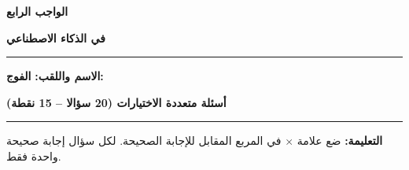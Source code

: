 \documentclass[a4paper]{article}
\newif\ifcorrection
\begin{document}
\begin{center}

{\Large\khatt\textbf{الواجب الرابع}\ifcorrection\ \textbf{-- التصحيح النموذجي}\fi}

\vspace{0.2cm}

{\Large\khatt\textbf{في الذكاء الاصطناعي}}

\end{center}

\rule{\textwidth}{1pt}

\ifcorrection\else
\textbf{الاسم واللقب:} \dotfill \quad \textbf{الفوج:} \makebox[3cm]{\dotfill}

\vspace{0.3cm}
\fi

\begin{center}

{\khatt\textbf{أسئلة متعددة الاختيارات (20 سؤالا -- 15 نقطة)}}

\end{center}

\rule{\textwidth}{1pt}

\textbf{التعليمة:} ضع علامة \textbf{$\times$} في المربع المقابل للإجابة الصحيحة. لكل سؤال إجابة صحيحة واحدة فقط.

\vspace{0.3cm}
\end{document}
